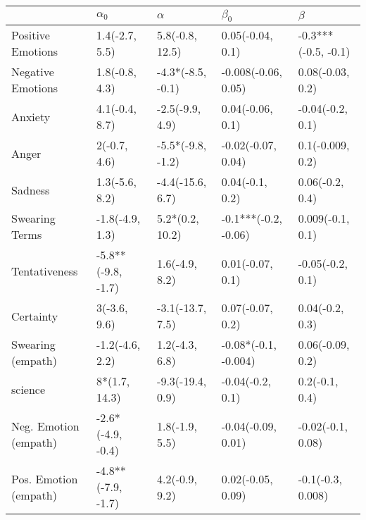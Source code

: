 \begin{tabular}{lllll}
\toprule
{} &          $\alpha_0$ &           $\alpha$ &             $\beta_0$ &              $\beta$ \\
\midrule
Positive Emotions     &      1.4(-2.7, 5.5) &    5.8(-0.8, 12.5) &      0.05(-0.04, 0.1) &  -0.3***(-0.5, -0.1) \\
Negative Emotions     &      1.8(-0.8, 4.3) &  -4.3*(-8.5, -0.1) &   -0.008(-0.06, 0.05) &     0.08(-0.03, 0.2) \\
Anxiety               &      4.1(-0.4, 8.7) &    -2.5(-9.9, 4.9) &      0.04(-0.06, 0.1) &     -0.04(-0.2, 0.1) \\
Anger                 &        2(-0.7, 4.6) &  -5.5*(-9.8, -1.2) &    -0.02(-0.07, 0.04) &     0.1(-0.009, 0.2) \\
Sadness               &      1.3(-5.6, 8.2) &   -4.4(-15.6, 6.7) &       0.04(-0.1, 0.2) &      0.06(-0.2, 0.4) \\
Swearing Terms        &     -1.8(-4.9, 1.3) &    5.2*(0.2, 10.2) &  -0.1***(-0.2, -0.06) &     0.009(-0.1, 0.1) \\
Tentativeness         &  -5.8**(-9.8, -1.7) &     1.6(-4.9, 8.2) &      0.01(-0.07, 0.1) &     -0.05(-0.2, 0.1) \\
Certainty             &        3(-3.6, 9.6) &   -3.1(-13.7, 7.5) &      0.07(-0.07, 0.2) &      0.04(-0.2, 0.3) \\
Swearing (empath)     &     -1.2(-4.6, 2.2) &     1.2(-4.3, 6.8) &  -0.08*(-0.1, -0.004) &     0.06(-0.09, 0.2) \\
science               &       8*(1.7, 14.3) &   -9.3(-19.4, 0.9) &      -0.04(-0.2, 0.1) &       0.2(-0.1, 0.4) \\
Neg. Emotion (empath) &   -2.6*(-4.9, -0.4) &     1.8(-1.9, 5.5) &    -0.04(-0.09, 0.01) &    -0.02(-0.1, 0.08) \\
Pos. Emotion (empath) &  -4.8**(-7.9, -1.7) &     4.2(-0.9, 9.2) &     0.02(-0.05, 0.09) &    -0.1(-0.3, 0.008) \\
\bottomrule
\end{tabular}
